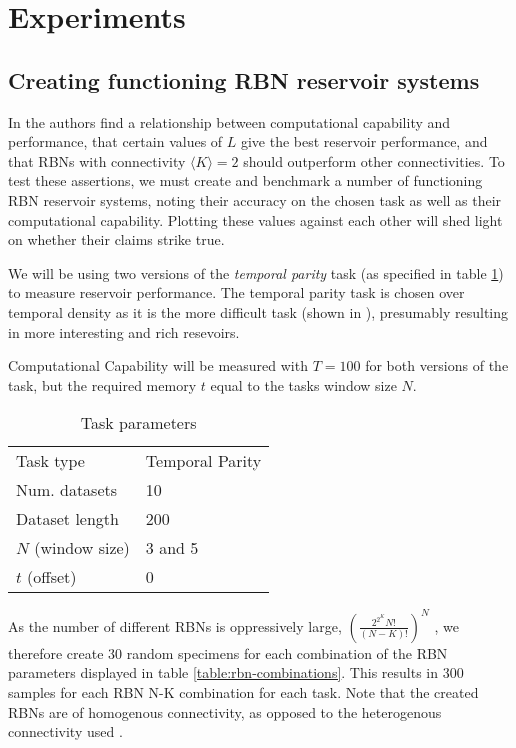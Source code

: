 \section{Experiments}

\subsection{Creating functioning RBN reservoir systems}

In \cite{rbn-reservoir} the authors find a relationship between computational capability and performance,
that certain values of $L$ give the best reservoir performance,
and that RBNs with connectivity $\langle K \rangle =2$ should outperform other connectivities.
To test these assertions,
we must create and benchmark a number of functioning RBN reservoir systems,
noting their accuracy on the chosen task as well as their computational capability.
Plotting these values against each other will shed light on whether their claims strike true.

We will be using two versions of the \textit{temporal parity} task
(as specified in table \ref{table:task-parameters}) to measure reservoir performance.
The temporal parity task is chosen over temporal density as it is the more difficult task
(shown in \cite{rbn-reservoir}), presumably resulting in more interesting and rich resevoirs.

Computational Capability will be measured with $T=100$ for both versions of the task,
but the required memory $t$ equal to the tasks window size $N$.

\begin{table}
  \centering
  \caption{Task parameters}
  \label{table:task-parameters}
  \begin{tabular}{ll}
    Task type         & Temporal Parity \\
    Num. datasets     & 10              \\
    Dataset length    & 200             \\
    $N$ (window size) & 3 and 5         \\
    $t$ (offset)      & 0               \\
  \end{tabular}
\end{table}


As the number of different RBNs is oppressively large,
$(\frac{2^{2^{K}}N!}{(N-K)!})^N$ \cite{gershenson2004introduction},
we therefore create 30 random specimens for each combination of the RBN parameters displayed in table \ref{table:rbn-combinations}.
This results in 300 samples for each RBN N-K combination for each task.
Note that the created RBNs are of homogenous connectivity,
as opposed to the heterogenous connectivity used \cite{rbn-reservoir}.

